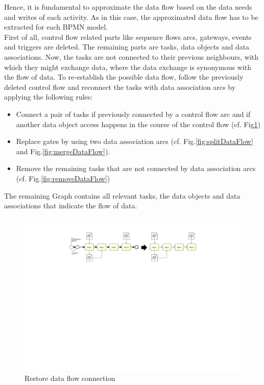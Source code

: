 Hence, it is fundamental to approximate the data flow based on the data needs and writes of each activity. As in this case, the approximated data flow has to be extracted for each BPMN model. \\
First of all, control flow related parts like sequence flows arcs, gateways, events and triggers are deleted. The remaining parts are tasks, data objects and data associations. Now, the tasks are not connected to their previous neighbours, with which they might exchange data, where the data exchange is synonymous with the flow of data.
To re-establish the possible data flow, follow the previously deleted control flow and reconnect the tasks with data association arcs by applying the following rules:

\begin{itemize}
	\item Connect a pair of tasks if previously connected by a control flow arc and 
	if another data object access happens in the course of the control flow (cf. Fig\ref{fig:restoreDataFlow})
	\item Replace gates by using two data association arcs (cf. Fig.\ref{fig:splitDataFlow} and Fig.\ref{fig:mergeDataFlow}). 
	\item Remove the remaining tasks that are not connected by data association arcs (cf. Fig.\ref{fig:removeDataFlow})
	
\end{itemize}
The remaining Graph contains all relevant tasks, the data objects and data associations that indicate the flow of data.

\begin{figure}[h!]
	\centering
	\includegraphics[width=\textwidth, trim={7.5cm 15cm 7cm 2cm}]{img/ExtractDFDRestore.pdf}
	\caption{Restore data flow connection}
	\label{fig:restoreDataFlow}
\end{figure}

